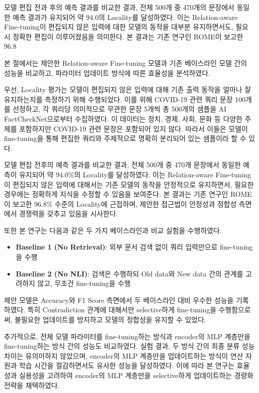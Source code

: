 \documentclass[a4paper,fleqn]{cas-sc}
\begin{document}
모델 편집 전과 후의 예측 결과를 비교한 결과, 전체 500개 중 470개의 문장에서 동일한 예측 결과가 유지되어 약 94.0의 Locality를 달성하였다. 이는 Relation-aware Fine-tuning이 편집되지 않은 입력에 대한 모델의 동작을 대부분 유지하면서도, 필요 시 정확한 편집이 이루어졌음을 의미한다. 본 결과는 기존 연구인 ROME이 보고한 96.8%

본 절에서는 제안한 Relation-aware Fine-tuning 모델과 기존 베이스라인 모델 간의 성능을 비교하고, 파라미터 업데이트 방식에 따른 효율성을 분석하였다.

우선, Locality 평가는 모델이 편집되지 않은 입력에 대해 기존 출력 동작을 얼마나 잘 유지하는지를 측정하기 위해 수행되었다. 이를 위해 COVID-19 관련 쿼리 문장 100개를 선정하고, 각 쿼리당 의미적으로 무관한 문장 5개씩 총 500개의 샘플을 AI FactCheckNet으로부터 수집하였다. 이 데이터는 정치, 경제, 사회, 문화 등 다양한 주제를 포함하지만 COVID-19 관련 문장은 포함되어 있지 않다. 따라서 이들은 모델이 fine-tuning을 통해 편집한 쿼리와 주제적으로 명확히 분리되어 있는 샘플이라 할 수 있다.

모델 편집 전후의 예측 결과를 비교한 결과, 전체 500개 중 470개 문장에서 동일한 예측이 유지되어 약 94.0\%의 Locality를 달성하였다. 이는 Relation-aware Fine-tuning이 편집되지 않은 입력에 대해서는 기존 모델의 동작을 안정적으로 유지하면서, 필요한 경우에는 정확하게 지식을 수정할 수 있음을 보여준다. 본 결과는 기존 연구인 ROME이 보고한 96.8\% 수준의 Locality에 근접하며, 제안한 접근법이 안정성과 정합성 측면에서 경쟁력을 갖추고 있음을 시사한다.

또한 본 연구는 다음과 같은 두 가지 베이스라인과 비교 실험을 수행하였다.
\begin{itemize}
    \item \textbf{Baseline 1 (No Retrieval)}: 외부 문서 검색 없이 쿼리 입력만으로 fine-tuning을 수행
    \item \textbf{Baseline 2 (No NLI)}: 검색은 수행하되 Old data와 New data 간의 관계를 고려하지 않고, 무조건 fine-tuning을 수행
\end{itemize}

제안 모델은 Accuracy와 F1 Score 측면에서 두 베이스라인 대비 우수한 성능을 기록하였다. 특히 Contradiction 관계에 대해서만 selective하게 fine-tuning을 수행함으로써, 불필요한 업데이트를 방지하고 모델의 정합성을 유지할 수 있었다.

추가적으로, 전체 모델 파라미터를 fine-tuning하는 방식과 encoder의 MLP 계층만을 fine-tuning하는 방식 간의 성능도 비교하였다. 실험 결과, 두 방식 간의 최종 분류 성능 차이는 유의미하지 않았으며, encoder의 MLP 계층만을 업데이트하는 방식이 연산 자원과 학습 시간을 절감하면서도 유사한 성능을 달성하였다. 이에 따라 본 연구는 효율성과 실용성을 고려하여 encoder의 MLP 계층만을 selective하게 업데이트하는 경량화 전략을 채택하였다.
\end{document}

